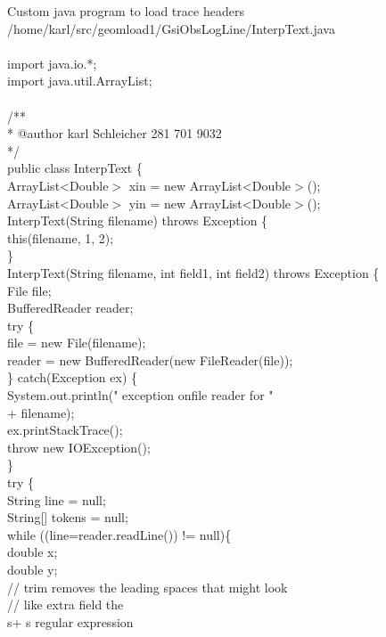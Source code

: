 ﻿Custom java program to load trace headers \\
/home/karl/src/geomload1/GsiObsLogLine/InterpText.java \\
 \\
import java.io.*; \\
import java.util.ArrayList; \\
 \\
/** \\
 * @author karl Schleicher 281 701 9032 \\
 */ \\
public class InterpText \{ \\
    ArrayList<Double$>$ xin = new ArrayList<Double$>$(); \\
    ArrayList<Double$>$ yin = new ArrayList<Double$>$(); \\
    InterpText(String filename) throws Exception \{  \\
            this(filename, 1, 2); \\
    \} \\
    InterpText(String filename, int field1, int field2) throws Exception \{ \\
        File file; \\
        BufferedReader reader;       \\
        try \{ \\
           file = new File(filename); \\
           reader = new BufferedReader(new FileReader(file)); \\
        \} catch(Exception ex) \{ \\
           System.out.println(" exception onfile reader for "  \\
	+ filename); \\
            ex.printStackTrace(); \\
            throw new IOException(); \\
        \} \\
        try \{ \\
            String line = null; \\
            String[] tokens = null; \\
            while ((line=reader.readLine()) != null)\{ \\
                double x; \\
                double y; \\
                // trim removes the leading spaces that might look           \\
                // like extra field the \\s+ s regular expression  \\
